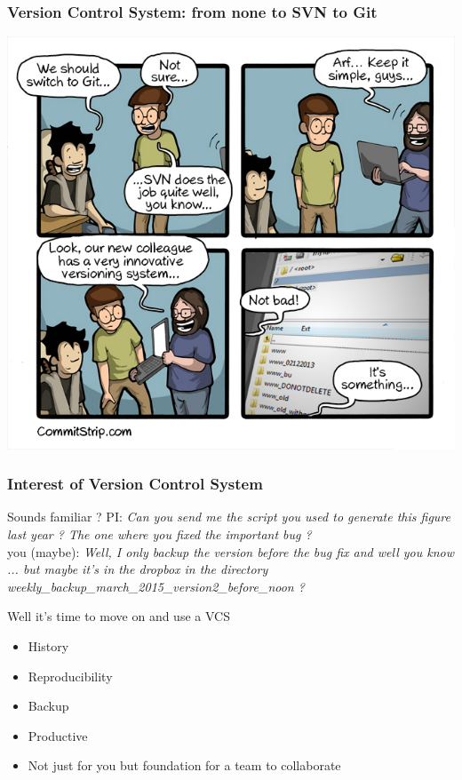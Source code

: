 



\begin{frame}
\frametitle{Version Control System: from none to SVN to Git}
\includegraphics[height=0.9\textheight, width=\textwidth]{images/comics_intro}
\end{frame}


\begin{frame}
    \frametitle{Interest of Version Control System}
        \begin{block}{Sounds familiar ?}
    PI: \textit{Can you send me the script you used to generate this 
    figure last year ? The one where you fixed the important bug ? }\\
    \vspace{1em}
    you (maybe): \textit{Well, I only backup the version before the bug fix 
    and well you know ... but maybe it's in the dropbox in the directory 
    weekly\_backup\_march\_2015\_version2\_before\_noon ?}
        \end{block}
    
    \pause 

    \begin{alertblock}{Well it's time to move on and use a VCS}
        \begin{itemize}
        \item History
        \item Reproducibility
        \item Backup 
        \item Productive
        \item Not just for you but foundation for a team to collaborate
        \end{itemize}
    \end{alertblock}
\end{frame}

